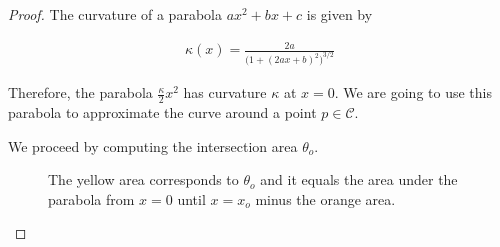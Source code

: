 \begin{proof} The curvature of a parabola $ax^2 + bx +c$ is given by

\begin{align*}
	\kappa(x) = \frac{2a}{\big(1+(2ax+b)^2\big)^{3/2}}
\end{align*}

Therefore, the parabola $\frac{\kappa}{2}x^2$ has curvature $\kappa$ at $x=0$. We are going to use this parabola to approximate the curve around a point $p \in \mathcal{C}$.

We proceed by computing the intersection area $\theta_o$.


\begin{figure}[h!]\label{fig:parabola-approx-ex}
\center
	\hspace{20pt}%
\caption{The yellow area corresponds to $\theta_o$ and it equals the area under the parabola from $x=0$ until $x=x_o$ minus the orange area.}
\end{figure}


\end{proof}
